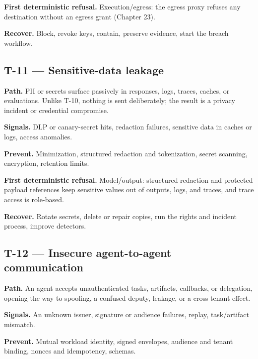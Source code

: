\textbf{First deterministic refusal.} Execution/egress: the egress proxy refuses any destination without an egress grant (Chapter 23).\par

\textbf{Recover.} Block, revoke keys, contain, preserve evidence, start the breach workflow.\par

\subsection{T-11 — Sensitive-data leakage}

\textbf{Path.} PII or secrets surface passively in responses, logs, traces, caches, or evaluations. Unlike T-10, nothing is sent deliberately; the result is a privacy incident or credential compromise.\par

\textbf{Signals.} DLP or canary-secret hits, redaction failures, sensitive data in caches or logs, access anomalies.\par

\textbf{Prevent.} Minimization, structured redaction and tokenization, secret scanning, encryption, retention limits.\par

\textbf{First deterministic refusal.} Model/output: structured redaction and protected payload references keep sensitive values out of outputs, logs, and traces, and trace access is role-based.\par

\textbf{Recover.} Rotate secrets, delete or repair copies, run the rights and incident process, improve detectors.\par

\subsection{T-12 — Insecure agent-to-agent communication}

\textbf{Path.} An agent accepts unauthenticated tasks, artifacts, callbacks, or delegation, opening the way to spoofing, a confused deputy, leakage, or a cross-tenant effect.\par

\textbf{Signals.} An unknown issuer, signature or audience failures, replay, task/artifact mismatch.\par

\textbf{Prevent.} Mutual workload identity, signed envelopes, audience and tenant binding, nonces and idempotency, schemas.\par

